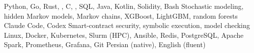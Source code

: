 
\begin{cvskilllist}
          {Python, Go, Rust, \Cpp, C, \Csharp, SQL, Java, Kotlin, Solidity,
           Bash}
          {Stochastic modeling, hidden Markov models, Markov chains, XGBoost,
           LightGBM, random forests}
          {Claude Code, Codex}
          {Smart-contract security, symbolic execution, model checking}
          {Linux, Docker, Kubernetes, Slurm (HPC), Ansible, Redis, PostgreSQL,
           Apache Spark, Prometheus, Grafana, Git}
          {Persian (native), English (fluent)}
\end{cvskilllist}
